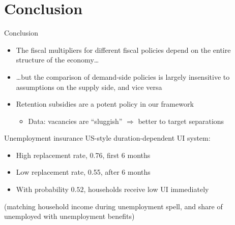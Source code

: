 \documentclass[aspectratio=169]{beamer}
\begin{document}
\section{Conclusion}

\begin{frame}{Conclusion}
    \begin{itemize}
        \item The fiscal multipliers for different fiscal policies depend on the entire structure of the economy\dots
        \item \dots but the comparison of demand-side policies is largely insensitive to assumptions on the supply side, and vice versa
        \item Retention subsidies are a potent policy in our framework
        \begin{itemize}
            \item Data: vacancies are ``sluggish'' $\Rightarrow$ better to target separations
        \end{itemize}
    \end{itemize}
\end{frame}

\appendix

\begin{frame}{Unemployment insurance}
\label{slide:ui}
	US-style duration-dependent UI system:

\begin{itemize}
\item High replacement rate, 0.76, first 6 months
\item Low replacement rate, 0.55, 
after 6 months
\item With probability $0.52$, households receive
low UI immediately
\end{itemize}

(matching household income during unemployment spell, and share of unemployed with unemployment benefits)

\hyperlink{slide:calibration}{}


\end{frame}
\end{document}
